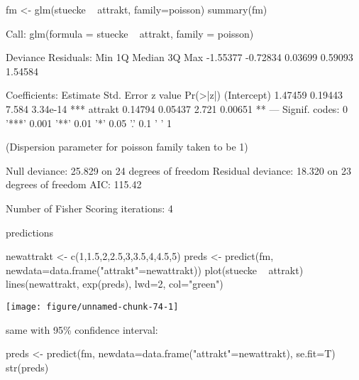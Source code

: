 \documentclass[a4paper,twoside]{tufte-book}\usepackage[]{graphicx}\usepackage[]{color}
\makeatletter
\def\maxwidth{ %
  \ifdim\Gin@nat@width>\linewidth
    \linewidth
  \else
    \Gin@nat@width
  \fi
}
\makeatother
\begin{document}
\begin{appendices}
\begin{Schunk}
\begin{Sinput}
fm <- glm(stuecke ~ attrakt, family=poisson)
summary(fm)
\end{Sinput}
\begin{Soutput}

Call:
glm(formula = stuecke ~ attrakt, family = poisson)

Deviance Residuals: 
     Min        1Q    Median        3Q       Max  
-1.55377  -0.72834   0.03699   0.59093   1.54584  

Coefficients:
            Estimate Std. Error z value Pr(>|z|)    
(Intercept)  1.47459    0.19443   7.584 3.34e-14 ***
attrakt      0.14794    0.05437   2.721  0.00651 ** 
---
Signif. codes:  0 '***' 0.001 '**' 0.01 '*' 0.05 '.' 0.1 ' ' 1

(Dispersion parameter for poisson family taken to be 1)

    Null deviance: 25.829  on 24  degrees of freedom
Residual deviance: 18.320  on 23  degrees of freedom
AIC: 115.42

Number of Fisher Scoring iterations: 4
\end{Soutput}
\end{Schunk}

predictions

\begin{Schunk}
\begin{Sinput}
newattrakt <- c(1,1.5,2,2.5,3,3.5,4,4.5,5)
preds <- predict(fm, newdata=data.frame("attrakt"=newattrakt))
plot(stuecke ~ attrakt)
lines(newattrakt, exp(preds), lwd=2, col="green")
\end{Sinput}

\texttt{[image: figure/unnamed-chunk-74-1]} \end{Schunk}

same with 95\% confidence interval:

\begin{Schunk}
\begin{Sinput}
preds <- predict(fm, newdata=data.frame("attrakt"=newattrakt), se.fit=T)
str(preds)
\end{Sinput}


\end{Schunk}
\end{appendices}
\end{document}
